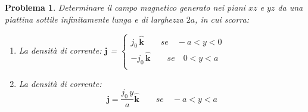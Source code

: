 \documentclass[a4paper,oneside]{article}
\newtheorem{problema}{Problema}
\renewcommand{\vec}[1]{\mathbf{#1}}
\renewcommand{\hat}[1]{\widehat{\mathbf{#1}}}
\begin{document}
\begin{problema}
	Determinare il campo magnetico generato nei piani 
	$xz$ e $yz$ da una piattina sottile infinitamente 
	lunga e di larghezza $2a$, in cui scorra:
	\begin{enumerate}
		\item La densità di corrente: 
		$\vec{j}$ = $\begin{cases}
		j_{0}\,\hat{k}\qquad se \quad  -a < y < 0	\\
		-j_{0}\,\hat{k}\qquad se \quad  0 < y < a \\
		\end{cases}$
		\item La densità di corrente:
		\begin{equation}
		\vec{j} =\frac{j_{0}\,y}{a}\hat{k} \qquad se \quad  -a < y < a
		\end{equation}
	\end{enumerate}
\end{problema}
\end{document}
